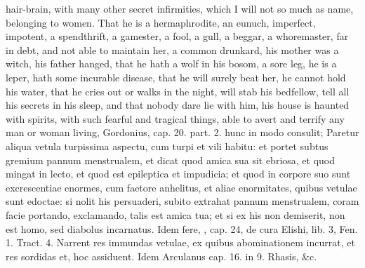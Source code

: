 hair-brain, with many other secret infirmities, which I will not so
much as name, belonging to women. That he is a hermaphrodite, an
eunuch, imperfect, impotent, a spendthrift, a gamester, a fool, a gull,
a beggar, a whoremaster, far in debt, and not able to maintain her, a
common drunkard, his mother was a witch, his father hanged, that he
hath a wolf in his bosom, a sore leg, he is a leper, hath some
incurable disease, that he will surely beat her, he cannot hold his
water, that he cries out or walks in the night, will stab his
bedfellow, tell all his secrets in his sleep, and that nobody dare lie
with him, his house is haunted with spirits, with such fearful and
tragical things, able to avert and terrify any man or woman living,
Gordonius, cap. 20. part. 2. hunc in modo consulit; Paretur aliqua
vetula turpissima aspectu, cum turpi et vili habitu: et portet subtus
gremium pannum menstrualem, et dicat quod amica sua sit ebriosa, et
quod mingat in lecto, et quod est epileptica et impudicia; et quod in
corpore suo sunt excrescentiae enormes, cum faetore anhelitus, et aliae
enormitates, quibus vetulae sunt edoctae: si nolit his persuaderi,
subito extrahat pannum menstrualem, coram facie portando,
exclamando, talis est amica tua; et si ex his non demiserit, non est
homo, sed diabolus incarnatus. Idem fere, \Avicenna{}, cap. 24, de cura
Elishi, lib. 3, Fen. 1. Tract. 4. Narrent res immundas vetulae, ex
quibus abominationem incurrat, et res sordidas et, hoc assiduent.
Idem Arculanus cap. 16. in 9. Rhasis, \&c.

